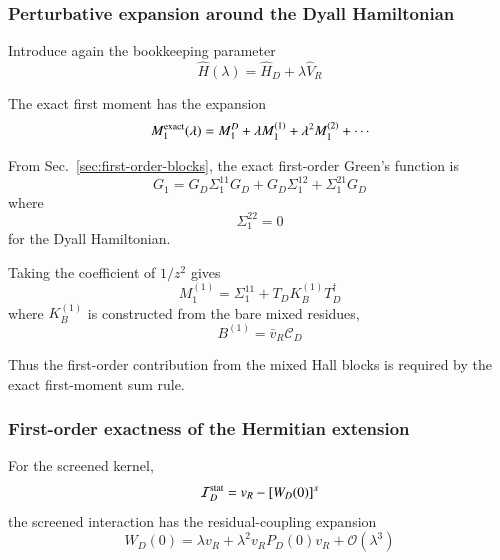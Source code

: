 \documentclass[aip,jcp,reprint,noshowkeys,superscriptaddress]{revtex4-1}
\begin{document}
\subsubsection{Perturbative expansion around the Dyall Hamiltonian}

Introduce again the bookkeeping parameter
\begin{equation}
  \hat H(\lambda)
  =
  \hat H_D
  +
  \lambda\hat V_R
\end{equation}

The exact first moment has the expansion
\begin{equation}
  M_1^{\rm exact}(\lambda)
  =
  M_1^D
  +
  \lambda M_1^{(1)}
  +
  \lambda^2 M_1^{(2)}
  +
  \cdots
  \label{eq:M1-exact-lambda}
\end{equation}

From Sec.~\ref{sec:first-order-blocks}, the exact first-order Green's function is
\begin{equation}
  G_1
  =
  G_D\Sigma_1^{11}G_D
  +
  G_D\Sigma_1^{12}
  +
  \Sigma_1^{21}G_D
\end{equation}
where
\begin{equation}
  \Sigma_1^{22}=0
\end{equation}
for the Dyall Hamiltonian.

Taking the coefficient of $1/z^2$ gives
\begin{equation}
  M_1^{(1)}
  =
  \Sigma_1^{11}
  +
  T_DK_B^{(1)}T_D^\dagger
  \label{eq:M1-firstorder-exact}
\end{equation}
where $K_B^{(1)}$ is constructed from the bare mixed residues,
\begin{equation}
  B^{(1)}
  =
  \bar v_R\mathcal C_D
\end{equation}

Thus the first-order contribution from the mixed Hall blocks is
required by the exact first-moment sum rule.


\subsubsection{First-order exactness of the Hermitian extension}

For the screened kernel,
\begin{equation}
  \mathcal I_D^{\rm stat}
  =
  v_R-[W_D(0)]^x
\end{equation}
the screened interaction has the residual-coupling expansion
\begin{equation}
  W_D(0)
  =
  \lambda v_R
  +
  \lambda^2
  v_RP_D(0)v_R
  +
  \mathcal O(\lambda^3)
  \label{eq:WD-lambda-expansion}
\end{equation}
\end{document}
